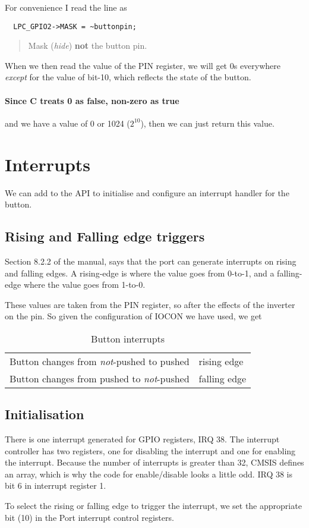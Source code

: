 \documentclass[a4paper]{tufte-handout}
\begin{document}
For convenience I read the line
as
\begin{verbatim}
  LPC_GPIO2->MASK = ~buttonpin;
\end{verbatim}
\begin{quote}
  Mask (\emph{hide}) \textbf{not} the button pin.
\end{quote}
When we then read the value of the PIN register, we will get 0s
everywhere \emph{except} for the value of bit-10, which reflects the
state of the button.
\paragraph{Since C treats 0 as false, non-zero as true} and we have a
value of 0 or 1024 ($2^{10}$), then we can just return this
value.

\section{Interrupts}
  We can add to the API to initialise and configure an
interrupt handler for the button.

\subsection{Rising and Falling edge triggers}
Section 8.2.2 of the manual, says that the port can generate
interrupts on rising and falling edges.  A rising-edge is where the
value goes from 0-to-1, and a falling-edge where the value goes from
1-to-0. 

These values are taken from the PIN register, so after the effects of
the inverter on the pin.  So given the configuration of IOCON we have
used, we get
\begin{table}
  \begin{tabular}{ll}
    Button changes from \emph{not}-pushed to pushed&rising edge\\
    Button changes from pushed to \emph{not}-pushed&falling edge\\
  \end{tabular}
  \caption{Button interrupts}
  \label{tab:buttonedges}
\end{table}

\subsection{Initialisation}
There is one interrupt generated for GPIO registers, IRQ 38.  The
interrupt controller has two registers, one for disabling the
interrupt and one for enabling the interrupt.  Because the number of
interrupts is greater than 32, CMSIS defines an array, which is why
the code for enable/disable looks a little odd.  IRQ 38 is bit 6 in
interrupt register 1.

To select the rising or falling edge to trigger the interrupt, we set
the appropriate bit (10) in the Port interrupt control registers.





\appendix
\end{document}
